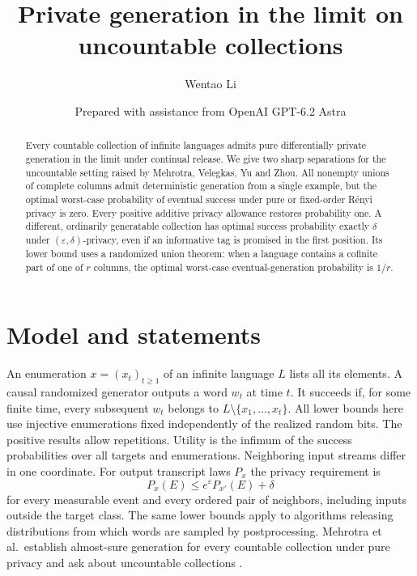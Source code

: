 \documentclass[11pt]{article}
\title{Private generation in the limit on uncountable collections}
\author{Wentao Li}
\date{\small Prepared with assistance from OpenAI GPT-6.2 Astra}
\begin{document}
\maketitle
\begin{abstract}
Every countable collection of infinite languages admits pure differentially private generation in the limit under continual release. We give two sharp separations for the uncountable setting raised by Mehrotra, Velegkas, Yu and Zhou. All nonempty unions of complete columns admit deterministic generation from a single example, but the optimal worst-case probability of eventual success under pure or fixed-order R\'enyi privacy is zero. Every positive additive privacy allowance restores probability one. A different, ordinarily generatable collection has optimal success probability exactly $\delta$ under $(\varepsilon,\delta)$-privacy, even if an informative tag is promised in the first position. Its lower bound uses a randomized union theorem: when a language contains a cofinite part of one of $r$ columns, the optimal worst-case eventual-generation probability is $1/r$.
\end{abstract}

\section{Model and statements}
An enumeration $x=(x_t)_{t\ge1}$ of an infinite language $L$ lists all its elements. A causal randomized generator outputs a word $w_t$ at time $t$. It succeeds if, for some finite time, every subsequent $w_t$ belongs to $L\setminus\{x_1,\ldots,x_t\}$. All lower bounds here use injective enumerations fixed independently of the realized random bits. The positive results allow repetitions. Utility is the infimum of the success probabilities over all targets and enumerations. Neighboring input streams differ in one coordinate. For output transcript laws $P_x$ the privacy requirement is
\[
 P_x(E)\le e^\varepsilon P_{x'}(E)+\delta
\]
for every measurable event and every ordered pair of neighbors, including inputs outside the target class. The same lower bounds apply to algorithms releasing distributions from which words are sampled by postprocessing. Mehrotra et al.\ establish almost-sure generation for every countable collection under pure privacy and ask about uncountable collections \cite[Theorem 1.1 and Section 5]{mvyz}.
\end{document}

